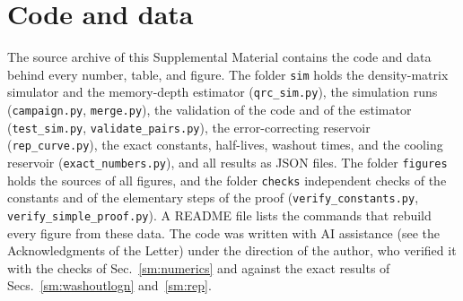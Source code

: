 \documentclass[aps,prl,twocolumn,superscriptaddress,floatfix]{revtex4-2}
\theoremstyle{plain}
\begin{document}
\section{Code and data}
\label{sm:code}

The source archive of this Supplemental Material contains the code and data behind every number, table, and figure. The folder \texttt{sim} holds the density-matrix simulator and the memory-depth estimator (\texttt{qrc\_sim.py}), the simulation runs (\texttt{campaign.py}, \texttt{merge.py}), the validation of the code and of the estimator (\texttt{test\_sim.py}, \texttt{validate\_pairs.py}), the error-correcting reservoir (\texttt{rep\_curve.py}), the exact constants, half-lives, washout times, and the cooling reservoir (\texttt{exact\_numbers.py}), and all results as JSON files. The folder \texttt{figures} holds the sources of all figures, and the folder \texttt{checks} independent checks of the constants and of the elementary steps of the proof (\texttt{verify\_constants.py}, \texttt{verify\_simple\_proof.py}). A README file lists the commands that rebuild every figure from these data. The code was written with AI assistance (see the Acknowledgments of the Letter) under the direction of the author, who verified it with the checks of Sec.~\ref{sm:numerics} and against the exact results of Secs.~\ref{sm:washoutlogn} and~\ref{sm:rep}.
\end{document}
